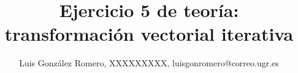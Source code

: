 \author{Luis González Romero, XXXXXXXXX, luisgonromero@correo.ugr.es}
\title{Ejercicio 5 de teoría: transformación vectorial iterativa}
\newcommand{\grupopracticas}{Grupo 1: Miércoles 09:30-11:30}
\newcommand{\subtitulo}{Subtítulo}
\newcommand{\curso}{Programación Paralela}
\newcommand{\departamento}{Lenguajes y Sistemas Informáticos}